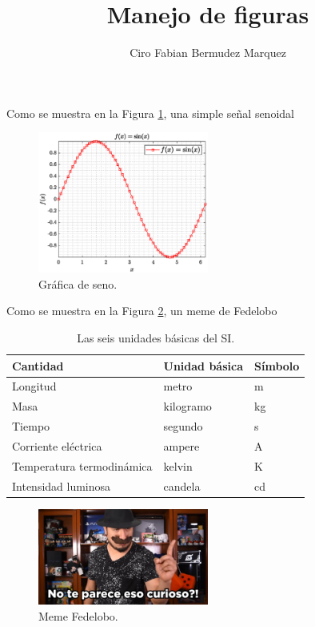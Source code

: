 \documentclass[10pt,a4paper]{article}
\author{Ciro Fabian Bermudez Marquez}
\title{Manejo de figuras}
\begin{document}
\maketitle

\lipsum[1-2]

Como se muestra en la Figura \ref{fig:a2_grafica_seno}, una simple señal senoidal

\begin{figure}[hbtp]
\centering
\includegraphics[width=0.5\textwidth]{imagenes/a2_grafica_seno.eps}
\caption{Gráfica de seno.}
\label{fig:a2_grafica_seno}
\end{figure}



Como se muestra en la Figura \ref{fig:a1_meme_fedelobo}, un meme de Fedelobo

	\begin{table}[!hbp]
		\centering
		\begin{tabular}{l  l  l}
			\textbf{Cantidad} &  \textbf{Unidad básica} & \textbf{Símbolo}\\
			\hline
			Longitud 					& metro 		& m		\\
			Masa 						& kilogramo 	& kg	\\
			Tiempo 						& segundo 		& s		\\
			Corriente eléctrica 		& ampere 		& A		\\
			Temperatura termodinámica 	& kelvin 		& K		\\
			Intensidad luminosa 		& candela 		& cd	\\
			\hline
		\end{tabular}
		\caption{Las seis unidades básicas del SI.}
		\label{tab:unidades}
	\end{table}
	


\begin{figure}[hbtp]
\centering
\includegraphics[width=0.5\textwidth]{imagenes/a1_meme_fedelobo.jpg}
\caption{Meme Fedelobo.}
\label{fig:a1_meme_fedelobo}
\end{figure}
\end{document}

